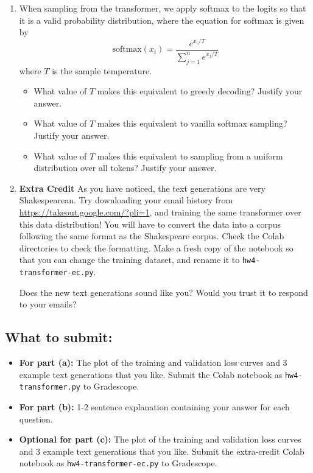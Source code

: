 \documentclass{article}
\begin{document}
\begin{aprob}
\begin{enumerate}
\noindent
For the dataset, you will be using the Shakespeare corpus, which contains all works from William Shakespeare. Important notes to remember:
\begin{itemize}
    \item Remember to embed the input. We will use a pretrained word vectorizer called GloVE. 
    \item Remember to apply the positional encoding to the $Q, K$ matrices. Attention alone is position invariant.
\end{itemize}
\item {} When sampling from the transformer, we apply softmax to the logits so that it is a valid probability distribution, where the equation for softmax is given by
$$
\text{softmax}(x_i) = \frac{e^{x_i / T}}{\sum_{j=1}^n  e^{x_j / T}}
$$
where $T$ is the sample temperature. 
\begin{itemize}
    \item What value of $T$ makes this equivalent to greedy decoding? Justify your answer.
    \item What value of $T$ makes this equivalent to vanilla softmax sampling? Justify your answer.
    \item What value of $T$ makes this equivalent to sampling from a uniform distribution over all tokens? Justify your answer.
\end{itemize} 
\item \textbf{Extra Credit}  As you have noticed, the text generations are very Shakespearean. Try downloading your email history from \href{https://takeout.google.com/?pli=1}{https://takeout.google.com/?pli=1}, and training the same transformer over this data distribution! You will have to convert the data into a corpus following the same format as the Shakespeare corpus. Check the Colab directories to check the formatting. Make a fresh copy of the notebook so that you can change the training dataset, and rename it to \texttt{hw4-transformer-ec.py}.

Does the new text generations sound like you? Would you trust it to respond to your emails?
\end{enumerate}

\subsection*{What to submit:}
\begin{itemize}
    \item \textbf{For part (a):} The plot of the training and validation loss curves and 3 example text generations that you like. Submit the Colab notebook as \texttt{hw4-transformer.py} to Gradescope.
    \item \textbf{For part (b):} 1-2 sentence explanation containing your answer for each question.
    \item \textbf{Optional for part (c):} The plot of the training and validation loss curves and 3 example text generations that you like. Submit the extra-credit Colab notebook as \texttt{hw4-transformer-ec.py} to Gradescope.
\end{itemize}
\end{aprob}
\end{document}
